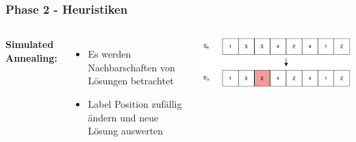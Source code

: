\documentclass[aspectratio=169]{beamer}
\begin{document}
\begin{frame}
	\frametitle{Phase 2 - Heuristiken}
	\begin{columns}[c] %
		
		\textbf{Simulated Annealing:}
		\begin{itemize}
			\item Es werden Nachbarschaften von Lösungen  betrachtet
			\item Label Position zufällig ändern und neue Lösung auswerten
		\end{itemize}
		\includegraphics[scale=.6]{sa_representation.pdf}
		
		
		
	\end{columns}
	\end{frame}
	
\end{document}
